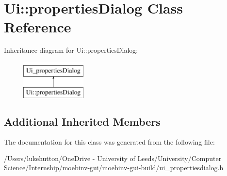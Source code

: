 \hypertarget{class_ui_1_1properties_dialog}{}\section{Ui\+:\+:properties\+Dialog Class Reference}
\label{class_ui_1_1properties_dialog}
Inheritance diagram for Ui\+:\+:properties\+Dialog\+:\begin{figure}[H]
\begin{center}
\leavevmode
\includegraphics[height=2.000000cm]{class_ui_1_1properties_dialog}
\end{center}
\end{figure}
\subsection*{Additional Inherited Members}


The documentation for this class was generated from the following file\+:\begin{DoxyCompactItemize}
\item 
/\+Users/lukehutton/\+One\+Drive -\/ University of Leeds/\+University/\+Computer Science/\+Internship/moebinv-\/gui/moebinv-\/gui-\/build/ui\+\_\+propertiesdialog.\+h\end{DoxyCompactItemize}
